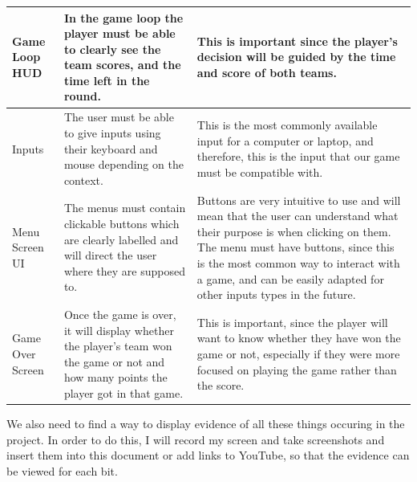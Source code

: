 \begin{center}
\begin{longtable}[c]{|p{2.7cm}|p{6.7cm}|p{5.7cm}|}
    Game Loop HUD & In the game loop the player must be able to clearly see the team scores, and the time left in the round. & This is important since the player's decision will be guided by the time and score of both teams.\\
    \hline
    Inputs & The user must be able to give inputs using their keyboard and mouse depending on the context. & This is the most commonly available input for a computer or laptop, and therefore, this is the input that our game must be compatible with.\\
    \hline
    Menu Screen UI & The menus must contain clickable buttons which are clearly labelled and will direct the user where they are supposed to. & Buttons are very intuitive to use and will mean that the user can understand what their purpose is when clicking on them. The menu must have buttons, since this is the most common way to interact with a game, and can be easily adapted for other inputs types in the future.\\
    \hline
    Game Over Screen & Once the game is over, it will display whether the player's team won the game or not and how many points the player got in that game. & This is important, since the player will want to know whether they have won the game or not, especially if they were more focused on playing the game rather than the score.\\
    \hline
\end{longtable}
\end{center}

We also need to find a way to display evidence of all these things occuring in the project. In order to do this, I will record my screen and take screenshots and insert them into this document or add links to YouTube, so that the evidence can be viewed for each bit.

